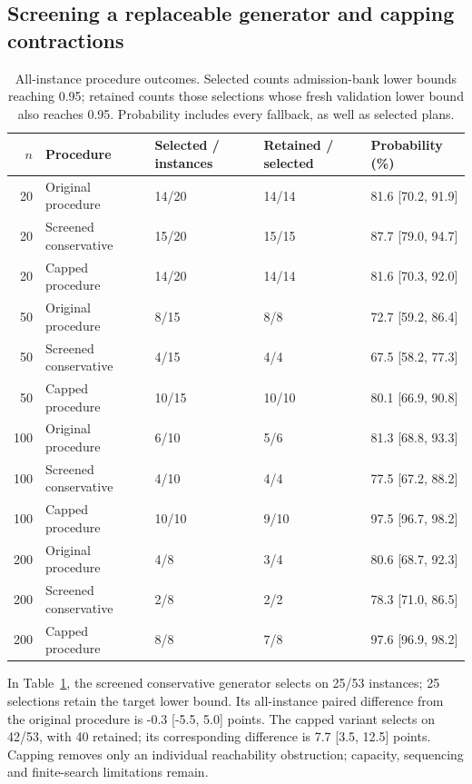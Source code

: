 \subsection{Screening a replaceable generator and capping contractions}

\begin{table}[htbp]
\centering
\small
\caption{All-instance procedure outcomes. Selected counts admission-bank lower bounds reaching 0.95; retained counts those selections whose fresh validation lower bound also reaches 0.95. Probability includes every fallback, as well as selected plans.}
\label{tab:screen}
\begin{tabular}{rllll}
\toprule
$n$ & Procedure & Selected / instances & Retained / selected & Probability (\%)\\
\midrule
20 & Original procedure & 14/20 & 14/14 & 81.6 [70.2, 91.9]\\
20 & Screened conservative & 15/20 & 15/15 & 87.7 [79.0, 94.7]\\
20 & Capped procedure & 14/20 & 14/14 & 81.6 [70.3, 92.0]\\
50 & Original procedure & 8/15 & 8/8 & 72.7 [59.2, 86.4]\\
50 & Screened conservative & 4/15 & 4/4 & 67.5 [58.2, 77.3]\\
50 & Capped procedure & 10/15 & 10/10 & 80.1 [66.9, 90.8]\\
100 & Original procedure & 6/10 & 5/6 & 81.3 [68.8, 93.3]\\
100 & Screened conservative & 4/10 & 4/4 & 77.5 [67.2, 88.2]\\
100 & Capped procedure & 10/10 & 9/10 & 97.5 [96.7, 98.2]\\
200 & Original procedure & 4/8 & 3/4 & 80.6 [68.7, 92.3]\\
200 & Screened conservative & 2/8 & 2/2 & 78.3 [71.0, 86.5]\\
200 & Capped procedure & 8/8 & 7/8 & 97.6 [96.9, 98.2]\\
\bottomrule
\end{tabular}
\end{table}


In Table~\ref{tab:screen}, the screened conservative generator selects on 25/53 instances; 25 selections retain the target lower bound. Its all-instance paired difference from the original procedure is -0.3 [-5.5, 5.0] points. The capped variant selects on 42/53, with 40 retained; its corresponding difference is 7.7 [3.5, 12.5] points. Capping removes only an individual reachability obstruction; capacity, sequencing and finite-search limitations remain.

